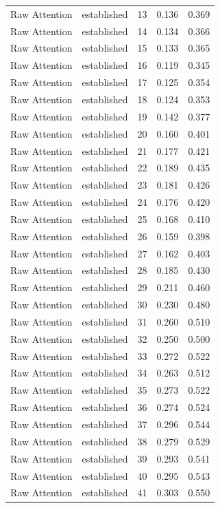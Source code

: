 \begin{tabular}{llrrr}
Raw Attention & established & 13 & 0.136 & 0.369 \\
Raw Attention & established & 14 & 0.134 & 0.366 \\
Raw Attention & established & 15 & 0.133 & 0.365 \\
Raw Attention & established & 16 & 0.119 & 0.345 \\
Raw Attention & established & 17 & 0.125 & 0.354 \\
Raw Attention & established & 18 & 0.124 & 0.353 \\
Raw Attention & established & 19 & 0.142 & 0.377 \\
Raw Attention & established & 20 & 0.160 & 0.401 \\
Raw Attention & established & 21 & 0.177 & 0.421 \\
Raw Attention & established & 22 & 0.189 & 0.435 \\
Raw Attention & established & 23 & 0.181 & 0.426 \\
Raw Attention & established & 24 & 0.176 & 0.420 \\
Raw Attention & established & 25 & 0.168 & 0.410 \\
Raw Attention & established & 26 & 0.159 & 0.398 \\
Raw Attention & established & 27 & 0.162 & 0.403 \\
Raw Attention & established & 28 & 0.185 & 0.430 \\
Raw Attention & established & 29 & 0.211 & 0.460 \\
Raw Attention & established & 30 & 0.230 & 0.480 \\
Raw Attention & established & 31 & 0.260 & 0.510 \\
Raw Attention & established & 32 & 0.250 & 0.500 \\
Raw Attention & established & 33 & 0.272 & 0.522 \\
Raw Attention & established & 34 & 0.263 & 0.512 \\
Raw Attention & established & 35 & 0.273 & 0.522 \\
Raw Attention & established & 36 & 0.274 & 0.524 \\
Raw Attention & established & 37 & 0.296 & 0.544 \\
Raw Attention & established & 38 & 0.279 & 0.529 \\
Raw Attention & established & 39 & 0.293 & 0.541 \\
Raw Attention & established & 40 & 0.295 & 0.543 \\
Raw Attention & established & 41 & 0.303 & 0.550 \\

\end{tabular}
